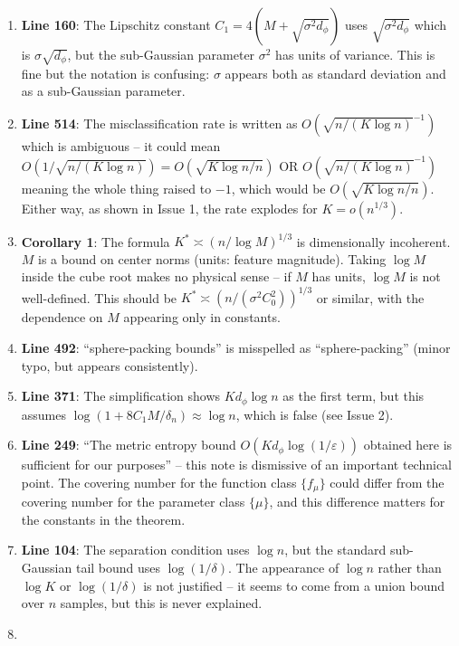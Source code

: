 \documentclass[
  12pt,
]{article}
\begin{document}
\begin{enumerate}
\def\labelenumi{\arabic{enumi}.}
\item
  \textbf{Line 160}: The Lipschitz constant
  \(C_1 = 4(M + \sqrt{\sigma^2 d_\phi})\) uses
  \(\sqrt{\sigma^2 d_\phi}\) which is \(\sigma\sqrt{d_\phi}\), but the
  sub-Gaussian parameter \(\sigma^2\) has units of variance. This is
  fine but the notation is confusing: \(\sigma\) appears both as
  standard deviation and as a sub-Gaussian parameter.
\item
  \textbf{Line 514}: The misclassification rate is written as
  \(O(\sqrt{n/(K \log n)}^{-1})\) which is ambiguous -- it could mean
  \(O(1/\sqrt{n/(K \log n)}) = O(\sqrt{K \log n / n})\) OR
  \(O(\sqrt{n/(K \log n)}^{-1})\) meaning the whole thing raised to
  \(-1\), which would be \(O(\sqrt{K \log n / n})\). Either way, as
  shown in Issue 1, the rate explodes for \(K = o(n^{1/3})\).
\item
  \textbf{Corollary 1}: The formula \(K^* \asymp (n / \log M)^{1/3}\) is
  dimensionally incoherent. \(M\) is a bound on center norms (units:
  feature magnitude). Taking \(\log M\) inside the cube root makes no
  physical sense -- if \(M\) has units, \(\log M\) is not well-defined.
  This should be \(K^* \asymp (n / (\sigma^2 C_0^2))^{1/3}\) or similar,
  with the dependence on \(M\) appearing only in constants.
\item
  \textbf{Line 492}: ``sphere-packing bounds'' is misspelled as
  ``sphere-packing'' (minor typo, but appears consistently).
\item
  \textbf{Line 371}: The simplification shows \(K d_\phi \log n\) as the
  first term, but this assumes
  \(\log(1 + 8C_1 M/\delta_n) \approx \log n\), which is false (see
  Issue 2).
\item
  \textbf{Line 249}: ``The metric entropy bound
  \(O(K d_\phi \log(1/\varepsilon))\) obtained here is sufficient for
  our purposes'' -- this note is dismissive of an important technical
  point. The covering number for the function class \(\{f_\mu\}\) could
  differ from the covering number for the parameter class \(\{\mu\}\),
  and this difference matters for the constants in the theorem.
\item
  \textbf{Line 104}: The separation condition uses \(\log n\), but the
  standard sub-Gaussian tail bound uses \(\log(1/\delta)\). The
  appearance of \(\log n\) rather than \(\log K\) or \(\log(1/\delta)\)
  is not justified -- it seems to come from a union bound over \(n\)
  samples, but this is never explained.
\item

\end{enumerate}
\end{document}
